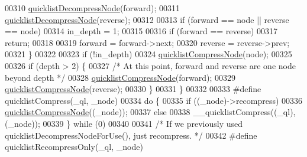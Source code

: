 \begin{DoxyCode}
{00310         \hyperlink{quicklist_8c_ad36c703b3140d19a69301890a903f890}{quicklistDecompressNode}(forward);
00311         \hyperlink{quicklist_8c_ad36c703b3140d19a69301890a903f890}{quicklistDecompressNode}(reverse);
00312 
00313         \textcolor{keywordflow}{if} (forward == node || reverse == node)
00314             in\_depth = 1;
00315 
00316         \textcolor{keywordflow}{if} (forward == reverse)
00317             \textcolor{keywordflow}{return};
00318 
00319         forward = forward->next;
00320         reverse = reverse->prev;
00321     \}
00322 
00323     \textcolor{keywordflow}{if} (!in\_depth)
00324         \hyperlink{quicklist_8c_a8f91173182833dbe55fe0de444e3d7d7}{quicklistCompressNode}(node);
00325 
00326     \textcolor{keywordflow}{if} (depth > 2) \{
00327         \textcolor{comment}{/* At this point, forward and reverse are one node beyond depth */}
00328         \hyperlink{quicklist_8c_a8f91173182833dbe55fe0de444e3d7d7}{quicklistCompressNode}(forward);
00329         \hyperlink{quicklist_8c_a8f91173182833dbe55fe0de444e3d7d7}{quicklistCompressNode}(reverse);
00330     \}
00331 \}
00332 
00333 \textcolor{preprocessor}{#}\textcolor{preprocessor}{define} \textcolor{preprocessor}{quicklistCompress}\textcolor{preprocessor}{(}\textcolor{preprocessor}{\_ql}\textcolor{preprocessor}{,} \textcolor{preprocessor}{\_node}\textcolor{preprocessor}{)}
00334     \textcolor{keywordflow}{do} \textcolor{preprocessor}{\{}
00335         \textcolor{keywordflow}{if} \textcolor{preprocessor}{(}\textcolor{preprocessor}{(}\textcolor{preprocessor}{\_node}\textcolor{preprocessor}{)}\textcolor{preprocessor}{->}\textcolor{preprocessor}{recompress}\textcolor{preprocessor}{)}
00336             \hyperlink{quicklist_8c_a8f91173182833dbe55fe0de444e3d7d7}{quicklistCompressNode}\textcolor{preprocessor}{(}\textcolor{preprocessor}{(}\textcolor{preprocessor}{\_node}\textcolor{preprocessor}{)}\textcolor{preprocessor}{)}\textcolor{preprocessor}{;}
00337         \textcolor{keywordflow}{else}
00338             \textcolor{preprocessor}{\_\_quicklistCompress}\textcolor{preprocessor}{(}\textcolor{preprocessor}{(}\textcolor{preprocessor}{\_ql}\textcolor{preprocessor}{)}\textcolor{preprocessor}{,} \textcolor{preprocessor}{(}\textcolor{preprocessor}{\_node}\textcolor{preprocessor}{)}\textcolor{preprocessor}{)}\textcolor{preprocessor}{;}
00339     \textcolor{preprocessor}{\}} \textcolor{keywordflow}{while} \textcolor{preprocessor}{(}0\textcolor{preprocessor}{)}
00340 
00341 \textcolor{comment}{/* If we previously used quicklistDecompressNodeForUse(), just recompress. */}
00342 \textcolor{preprocessor}{#}\textcolor{preprocessor}{define} \textcolor{preprocessor}{quicklistRecompressOnly}\textcolor{preprocessor}{(}\textcolor{preprocessor}{\_ql}\textcolor{preprocessor}{,} \textcolor{preprocessor}{\_node}\textcolor{preprocessor}{)}
}
\end{DoxyCode}
